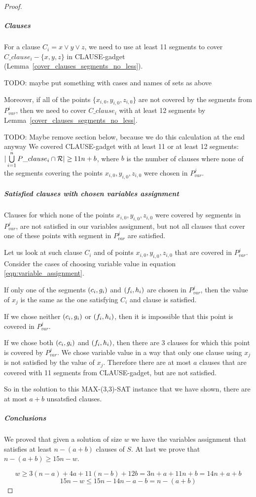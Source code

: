 \begin{proof}
\subparagraph{Clauses}

For a clause $C_i = x \lor y \lor z$,
we need to use at least 11 segments to cover $C\_clause_i - \{x, y, z\}$
in CLAUSE-gadget (Lemma~\ref{cover_clauses_segments_no_less}).

TODO: maybe put something with cases and names of sets as above

Moreover, if all of the points $\{x_{i,0}, y_{i,0}, z_{i,0}\}$
are not covered by the segments from $P_{var}^i$,
then we need to cover $C\_clause_i$
with at least 12 segments
by Lemma~\ref{cover_clauses_segments_no_less}.


TODO: Maybe remove section below, because we do this calculation at the end anyway
We covered CLAUSE-gadget with at least 11 or at least 12 segments:
$|\bigcup\limits_{i=1}^n P\_clause_i \cap \mathcal{R}| \ge 11n + b$,
where $b$ is the number of clauses
where none of the segments covering the points $x_{i,0}, y_{i,0}, z_{i,0}$ were chosen
in $P_{var}^j$.

\subparagraph{Satisfied clauses with chosen variables assignment}

Clauses for which none of
the points $x_{i,0}, y_{i,0}, z_{i,0}$ were covered by segments in $P_{var}^j$,
are not satisfied in our variables assignment, but not all clauses
that cover one of these points with segment in $P_{var}^j$ are satisfied.

Let us look at such clause $C_i$ and of points $x_{i,0}, y_{i,0}, z_{i,0}$
that are covered in $P_{var}^j$.
Consider the cases of choosing variable value in
equation \eqref{eqn:variable_assignment}.

If only one of the segments $(c_i, g_i)$ and $(f_i, h_i)$
are chosen in $P_{var}^{j}$, then the value of $x_j$
is the same as the one satisfying $C_i$ and clause is satisfied.

If we chose neither $(c_i, g_i)$ or $(f_i, h_i)$,
then it is impossible that this point is covered in $P_{var}^j$.

If we chose both $(c_i, g_i)$ and $(f_i, h_i)$,
then there are 3 clauses for which this point
is covered by $P_{var}^j$. We chose variable value in a way
that only one clause using $x_j$ is not satisfied by the value of $x_j$.
Therefore there are at most $a$ clauses that are covered with
11 segments from CLAUSE-gadget, but are not satisfied.

So in the solution to this MAX-(3,3)-SAT instance that we have shown,
there are at most $a+b$ unsatsfied clauses.

\subparagraph{Conclusions}

We proved that given a solution of size $w$ we have
the variables assignment that satisfies at least $n-(a+b)$ clauses of $S$.
At last we prove that $n-(a+b) \ge 15n-w$.

$$w \ge 3(n-a) + 4a + 11(n-b) + 12b = 3n + a + 11n + b = 14n + a + b$$
$$15n - w  \le 15n - 14n - a - b = n - (a+b)$$

\end{proof}


